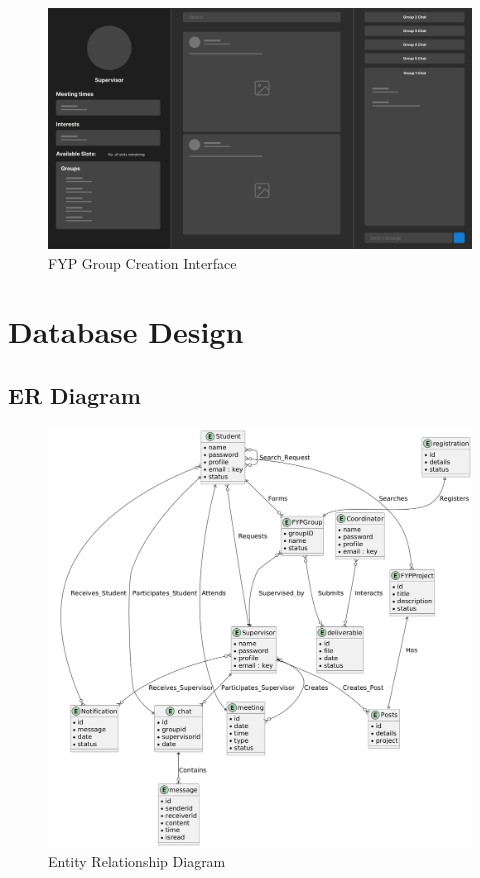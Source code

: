 \documentclass{FastFyp}
\begin{document}
\begin{figure}[H]
    \centering
    \includegraphics[width=\textwidth]{Figures/gui4}
    \caption{FYP Group Creation Interface}
\end{figure}


\pagebreak
\section{Database Design}

\subsection{ER Diagram}

\begin{figure}[H]
    \centering
    \includegraphics[width=\textwidth]{Figures/ER}
    \caption{Entity Relationship Diagram}
\end{figure}
\end{document}
